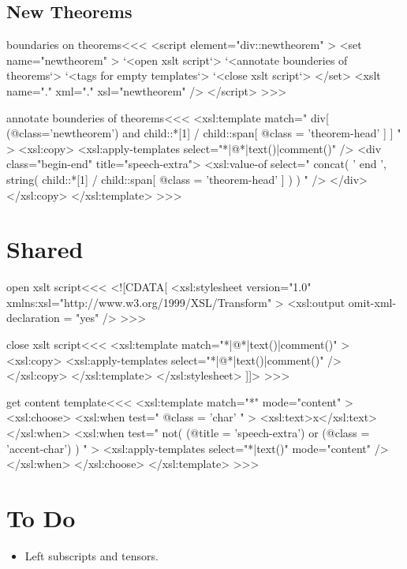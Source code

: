 \documentclass{article}
\begin{document}
\subsection{New Theorems}

\<boundaries on theorems\><<<
<script element="div::newtheorem" >
  <set name="newtheorem" >
     `<open xslt script`>
     `<annotate bounderies of theorems`> 
     `<tags for empty templates`>
     `<close xslt script`>
  </set>
  <xslt name="." xml="." xsl="newtheorem" />
</script> 
>>>


\<annotate bounderies of theorems\><<<
<xsl:template match=" 
    div[   (@class='newtheorem') 
         and
           child::*[1] / child::span[ @class = 'theorem-head' ]
    ]
" >
   <xsl:copy>
     <xsl:apply-templates select="*|@*|text()|comment()" />
     <div class="begin-end" title="speech-extra"> 
        <xsl:value-of select=" 
           concat( ' end ',
                   string( child::*[1] / 
                           child::span[ @class = 'theorem-head' ] )
           ) " />
     </div>
   </xsl:copy>
</xsl:template> 
>>>









\section{Shared}



\<open xslt script\><<<
<![CDATA[ 
   <xsl:stylesheet version="1.0"
      xmlns:xsl="http://www.w3.org/1999/XSL/Transform"
   >
      <xsl:output omit-xml-declaration = "yes" />
>>>

\<close xslt script\><<<
      <xsl:template match="*|@*|text()|comment()" >
        <xsl:copy>
          <xsl:apply-templates select="*|@*|text()|comment()" />
        </xsl:copy>
      </xsl:template>
   </xsl:stylesheet> 
]]>
>>>


\<get content template\><<<
<xsl:template match="*" mode="content" >
  <xsl:choose>
     <xsl:when test=" @class = 'char' " >   
       <xsl:text>x</xsl:text>
     </xsl:when>
     <xsl:when test=" not( 
            (@title = 'speech-extra') or (@class = 'accent-char')
         ) " >
       <xsl:apply-templates select="*|text()" mode="content" />
     </xsl:when>
  </xsl:choose>
</xsl:template> 
>>>


\section{To Do}

\begin{itemize}
\item
Left subscripts and tensors.
\end{itemize}


\end{document}
